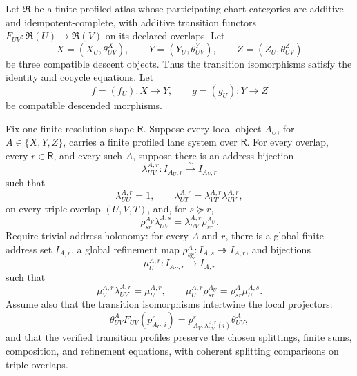 \begin{theorem}
\label{thm:block15-lane-descent}
Let \(\mathfrak R\) be a finite profiled atlas whose participating chart
categories are additive and idempotent-complete, with additive transition
functors \(F_{UV}:\mathfrak R(U)\to\mathfrak R(V)\) on its declared
overlaps.  Let
\[
 X=(X_U,\theta^X_{UV}),
 \qquad
 Y=(Y_U,\theta^Y_{UV}),
 \qquad
 Z=(Z_U,\theta^Z_{UV})
\]
be three compatible descent objects.  Thus the transition isomorphisms satisfy
the identity and cocycle equations.  Let
\[
 f=(f_U):X\longrightarrow Y,
 \qquad
 g=(g_U):Y\longrightarrow Z
\]
be compatible descended morphisms.

Fix one finite resolution shape \(\mathsf R\).  Suppose every local object
\(A_U\), for \(A\in\{X,Y,Z\}\), carries a finite profiled lane system over
\(\mathsf R\).  For every overlap, every \(r\in\mathsf R\), and every such
\(A\), suppose there is an address bijection
\[
 \lambda_{UV}^{A,r}:
 I_{A_U,r}\xrightarrow{\sim}I_{A_V,r}
\]
such that
\[
 \lambda_{UU}^{A,r}=1,
 \qquad
 \lambda_{UT}^{A,r}
 =\lambda_{VT}^{A,r}\lambda_{UV}^{A,r},
\]
on every triple overlap \((U,V,T)\), and, for \(s\succeq r\),
\[
 \rho_{sr}^{A_V}\lambda_{UV}^{A,s}
 =
 \lambda_{UV}^{A,r}\rho_{sr}^{A_U}.
\]
Require trivial address holonomy: for every \(A\) and \(r\), there is a
global finite address set \(I_{A,r}\), a global refinement map
\(\rho_{sr}^{A}:I_{A,s}\twoheadrightarrow I_{A,r}\), and bijections
\[
 \mu_U^{A,r}:I_{A_U,r}\xrightarrow{\sim}I_{A,r}
\]
such that
\[
 \mu_V^{A,r}\lambda_{UV}^{A,r}=\mu_U^{A,r},
 \qquad
 \mu_U^{A,r}\rho_{sr}^{A_U}
 =\rho_{sr}^{A}\mu_U^{A,s}.
\]
Assume also that the transition isomorphisms intertwine the local projectors:
\[
 \theta^A_{UV}
 F_{UV}(p_{A_U,i}^r)
 =
 p_{A_V,\lambda_{UV}^{A,r}(i)}^r
 \theta^A_{UV},
\]
and that the verified transition profiles preserve the chosen splittings,
finite sums, composition, and refinement equations, with coherent splitting
comparisons on triple overlaps.


\end{theorem}
